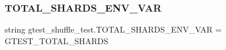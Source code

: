\subsubsection{\texorpdfstring{T\+O\+T\+A\+L\+\_\+\+S\+H\+A\+R\+D\+S\+\_\+\+E\+N\+V\+\_\+\+V\+AR}{TOTAL\_SHARDS\_ENV\_VAR}}
{\footnotesize\ttfamily string gtest\+\_\+shuffle\+\_\+test.\+T\+O\+T\+A\+L\+\_\+\+S\+H\+A\+R\+D\+S\+\_\+\+E\+N\+V\+\_\+\+V\+AR = \textquotesingle{}G\+T\+E\+S\+T\+\_\+\+T\+O\+T\+A\+L\+\_\+\+S\+H\+A\+R\+DS\textquotesingle{}}

